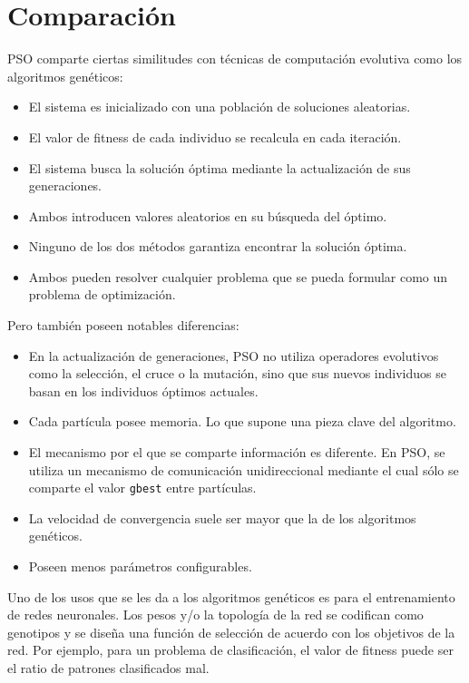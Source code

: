 \documentclass[a4paper,12pt,titlepage]{article}
\begin{document}
\section{Comparación}

PSO comparte ciertas similitudes con técnicas de computación evolutiva como los algoritmos genéticos:

\begin{itemize}[noitemsep]
	\item El sistema es inicializado con una población de soluciones aleatorias.
	\item El valor de fitness de cada individuo se recalcula en cada iteración.
	\item El sistema busca la solución óptima mediante la actualización de sus generaciones.
	\item Ambos introducen valores aleatorios en su búsqueda del óptimo.
	\item Ninguno de los dos métodos garantiza encontrar la solución óptima.
	\item Ambos pueden resolver cualquier problema que se pueda formular como un problema de optimización.
\end{itemize}

Pero también poseen notables diferencias:

\begin{itemize}[noitemsep]
	\item En la actualización de generaciones, PSO no utiliza operadores evolutivos como la selección, el cruce o la mutación, sino que sus nuevos individuos se basan en los individuos óptimos actuales.
	\item Cada partícula posee memoria. Lo que supone una pieza clave del algoritmo.
	\item El mecanismo por el que se comparte información es diferente. En PSO, se utiliza un mecanismo de comunicación unidireccional mediante el cual sólo se comparte el valor  \lstinline|gbest| entre partículas.
	\item La velocidad de convergencia suele ser mayor que la de los algoritmos genéticos.
	\item Poseen menos parámetros configurables.
\end{itemize}

Uno de los usos que se les da a los algoritmos genéticos es para el entrenamiento de redes neuronales. Los pesos y/o la topología de la red se codifican como genotipos y se diseña una función de selección de acuerdo con los objetivos de la red. Por ejemplo, para un problema de clasificación, el valor de fitness puede ser el ratio de patrones clasificados mal.
\end{document}
